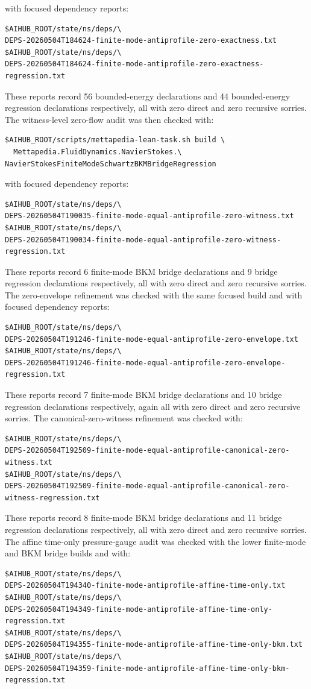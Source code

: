 \documentclass[11pt]{article}
\begin{document}
with focused dependency reports:
\begin{verbatim}
$AIHUB_ROOT/state/ns/deps/\
DEPS-20260504T184624-finite-mode-antiprofile-zero-exactness.txt
$AIHUB_ROOT/state/ns/deps/\
DEPS-20260504T184624-finite-mode-antiprofile-zero-exactness-regression.txt
\end{verbatim}
These reports record 56 bounded-energy declarations and 44 bounded-energy
regression declarations respectively, all with zero direct and zero recursive
sorries.
The witness-level zero-flow audit was then checked with:
\begin{verbatim}
$AIHUB_ROOT/scripts/mettapedia-lean-task.sh build \
  Mettapedia.FluidDynamics.NavierStokes.\
NavierStokesFiniteModeSchwartzBKMBridgeRegression
\end{verbatim}
with focused dependency reports:
\begin{verbatim}
$AIHUB_ROOT/state/ns/deps/\
DEPS-20260504T190035-finite-mode-equal-antiprofile-zero-witness.txt
$AIHUB_ROOT/state/ns/deps/\
DEPS-20260504T190034-finite-mode-equal-antiprofile-zero-witness-regression.txt
\end{verbatim}
These reports record 6 finite-mode BKM bridge declarations and 9 bridge
regression declarations respectively, all with zero direct and zero recursive
sorries.
The zero-envelope refinement was checked with the same focused build and with
focused dependency reports:
\begin{verbatim}
$AIHUB_ROOT/state/ns/deps/\
DEPS-20260504T191246-finite-mode-equal-antiprofile-zero-envelope.txt
$AIHUB_ROOT/state/ns/deps/\
DEPS-20260504T191246-finite-mode-equal-antiprofile-zero-envelope-regression.txt
\end{verbatim}
These reports record 7 finite-mode BKM bridge declarations and 10 bridge
regression declarations respectively, again all with zero direct and zero
recursive sorries.
The canonical-zero-witness refinement was checked with:
\begin{verbatim}
$AIHUB_ROOT/state/ns/deps/\
DEPS-20260504T192509-finite-mode-equal-antiprofile-canonical-zero-witness.txt
$AIHUB_ROOT/state/ns/deps/\
DEPS-20260504T192509-finite-mode-equal-antiprofile-canonical-zero-witness-regression.txt
\end{verbatim}
These reports record 8 finite-mode BKM bridge declarations and 11 bridge
regression declarations respectively, all with zero direct and zero recursive
sorries.
The affine time-only pressure-gauge audit was checked with the lower
finite-mode and BKM bridge builds and with:
\begin{verbatim}
$AIHUB_ROOT/state/ns/deps/\
DEPS-20260504T194340-finite-mode-antiprofile-affine-time-only.txt
$AIHUB_ROOT/state/ns/deps/\
DEPS-20260504T194349-finite-mode-antiprofile-affine-time-only-regression.txt
$AIHUB_ROOT/state/ns/deps/\
DEPS-20260504T194355-finite-mode-antiprofile-affine-time-only-bkm.txt
$AIHUB_ROOT/state/ns/deps/\
DEPS-20260504T194359-finite-mode-antiprofile-affine-time-only-bkm-regression.txt
\end{verbatim}
\end{document}
